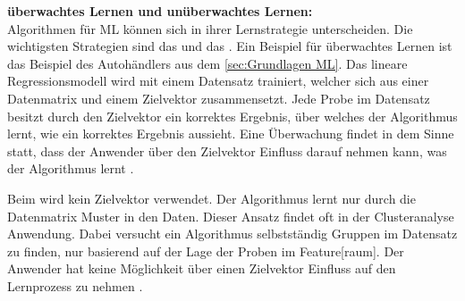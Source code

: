 \textbf{\Gls{überwachtes Lernen} und \gls{unüberwachtes Lernen}:}\\
Algorithmen für \gls{ML} können sich in ihrer Lernstrategie unterscheiden. Die wichtigsten Strategien sind das  und das . Ein Beispiel für \gls{überwachtes Lernen} ist das Beispiel des Autohändlers aus dem \autoref{sec:Grundlagen ML}. Das lineare Regressionsmodell wird mit einem Datensatz trainiert, welcher sich aus einer \gls{Datenmatrix} und einem \gls{Zielvektor} zusammensetzt. Jede Probe im Datensatz besitzt durch den \gls{Zielvektor} ein korrektes Ergebnis, über welches der Algorithmus lernt, wie ein korrektes Ergebnis aussieht. Eine Überwachung findet in dem Sinne statt, dass der Anwender über den \gls{Zielvektor} Einfluss darauf nehmen kann, was der Algorithmus lernt \cite{Burkov.2019, Goodfellow.2016}.\par

Beim  wird kein \gls{Zielvektor} verwendet. Der Algorithmus lernt nur durch die \gls{Datenmatrix} Muster in den Daten. Dieser Ansatz findet oft in der Clusteranalyse Anwendung. Dabei versucht ein Algorithmus selbstständig Gruppen im Datensatz zu finden, nur basierend auf der Lage der Proben im \gls{Feature}[raum]. Der Anwender hat keine Möglichkeit über einen \gls{Zielvektor} Einfluss auf den Lernprozess zu nehmen \cite{Burkov.2019, Goodfellow.2016}. \dubpar

